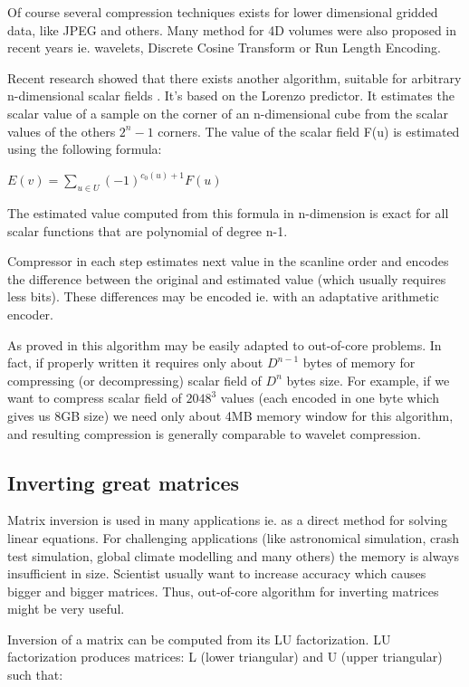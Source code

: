 Of course several compression techniques exists for lower dimensional gridded data,
like JPEG and others. Many method for 4D volumes were also proposed in recent years ie.
wavelets, Discrete Cosine Transform or Run Length Encoding.

Recent research showed that there exists another algorithm, suitable for arbitrary
n-dimensional scalar fields \cite{ndim-fields}. It's based on the Lorenzo predictor.
It estimates the scalar value of a sample on the corner of an n-dimensional cube
from the scalar values of the others $2^{n}-1$ corners. The value of the scalar field
F(u) is estimated using the following formula:
\bigskip

$E(v)=\displaystyle \sum_{u \in U} (-1)^{c_{0}(u)+1}F(u)$
\bigskip

The estimated value computed from this formula in n-dimension is exact
for all scalar functions that are polynomial of degree n-1.

Compressor in each step estimates next value in the scanline order and encodes the difference
between the original and estimated value (which usually requires less bits). These differences
may be encoded ie. with an adaptative arithmetic encoder.

As proved in \cite{ndim-fields} this algorithm may be easily adapted to out-of-core problems.
In fact, if properly written it requires only about $D^{n-1}$ bytes of memory for compressing (or decompressing)
scalar field of $D^{n}$ bytes size. For example, if we want to compress scalar field of $2048^3$ values
(each encoded in one byte which gives us 8GB size) we need only about 4MB memory window for this algorithm, and
resulting compression is generally comparable to wavelet compression.

\subsection{Inverting great matrices}

Matrix inversion is used in many applications ie. as a direct method for solving linear equations.
For challenging applications (like astronomical simulation, crash test simulation, global climate modelling and many others) the memory is always insufficient in size.
Scientist usually want to increase accuracy which causes bigger and bigger matrices.
Thus, out-of-core algorithm for inverting matrices might be very useful.

Inversion of a matrix can be computed from its LU factorization.
LU factorization produces matrices: L (lower triangular) and U (upper triangular) such that:
\bigskip

